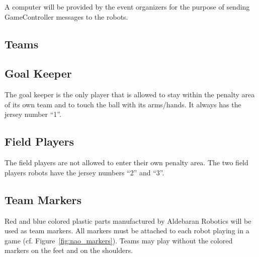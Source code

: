 \documentclass[12pt]{article}
\newcommand{\cf}{\mbox{cf.}\xspace}
\begin{document}
A computer will be provided by the event organizers for the purpose
of sending GameController messages to the robots.

\subsection{Teams}

\subsection{Goal Keeper}
\label{sec:goal_keeper}

The goal keeper is the only player that is allowed to stay within
the penalty area of its own team and to touch the ball with its arms/hands. It always has the jersey number
``1''.

\subsection{Field Players}
\label{sec:field_players}

The field players are not allowed to enter their own penalty area.
The two field players robots have the jersey numbers ``2'' and ``3''.

\subsection{Team Markers}

Red and blue colored plastic parts manufactured by Aldebaran Robotics will be used as team markers. All markers
must be attached to each robot playing in a game (\cf Figure~\ref{fig:nao_markers}). Teams may play without the colored markers on the feet and on the shoulders.
\end{document}

